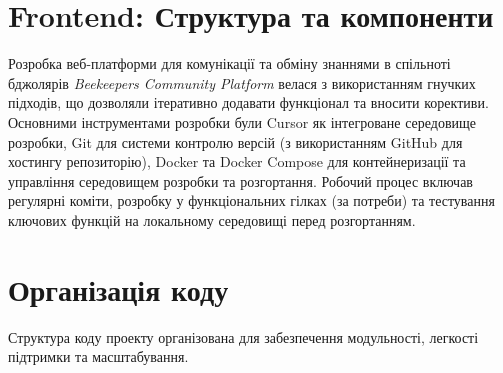 \section{Frontend: Структура та компоненти}
Розробка веб-платформи для комунікації та обміну знаннями в спільноті бджолярів \textit{Beekeepers Community Platform} велася з використанням гнучких підходів, що дозволяли ітеративно додавати функціонал та вносити корективи. Основними інструментами розробки були Cursor як інтегроване середовище розробки, Git для системи контролю версій (з використанням GitHub для хостингу репозиторію), Docker та Docker Compose для контейнеризації та управління середовищем розробки та розгортання. Робочий процес включав регулярні коміти, розробку у функціональних гілках (за потреби) та тестування ключових функцій на локальному середовищі перед розгортанням.

\section{Організація коду}
\label{sec:code_organization}
Структура коду проекту організована для забезпечення модульності, легкості підтримки та масштабування.

